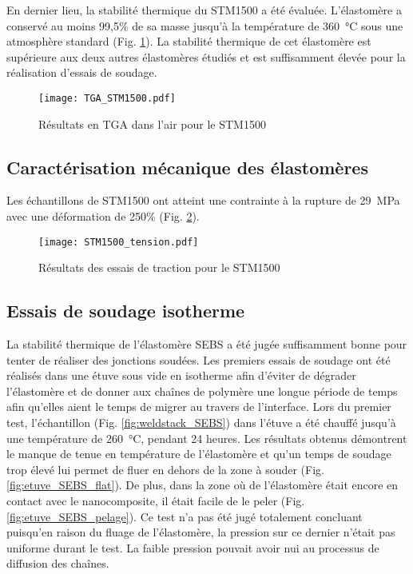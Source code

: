 \FloatBarrier

En dernier lieu, la stabilité thermique du STM1500 a été évaluée. 
L'élastomère a conservé au moins 99,5\% de sa masse jusqu'à la température de \SI{360}{\celsius} sous une atmosphère standard (Fig. \ref{fig:TGA_STM1500}). 
La stabilité thermique de cet élastomère est supérieure aux deux autres élastomères étudiés et est suffisamment élevée pour la réalisation d'essais de soudage. 

\begin{figure}[h]
	\centering
	\texttt{[image: TGA\_STM1500.pdf]}
	\caption{Résultats en TGA dans l'air pour le STM1500}
	\label{fig:TGA_STM1500}
\end{figure}

\FloatBarrier
\subsection{Caractérisation mécanique des élastomères}

Les échantillons de STM1500 ont atteint une contrainte à la rupture de \SI{29}{\mega\pascal} avec une déformation de 250\% (Fig. \ref{fig:STM1500_tension}). 

\begin{figure}[h]
	\centering
	\texttt{[image: STM1500\_tension.pdf]}
	\caption{Résultats des essais de traction pour le STM1500}
	\label{fig:STM1500_tension}
\end{figure}

\FloatBarrier
\subsection{Essais de soudage isotherme}

La stabilité thermique de l'élastomère SEBS a été jugée suffisamment bonne pour tenter de réaliser des jonctions soudées. 
Les premiers essais de soudage ont été réalisés dans une étuve sous vide en isotherme afin d'éviter de dégrader l'élastomère et de donner aux chaînes de polymère une longue période de temps afin qu'elles aient le temps de migrer au travers de l'interface. 
Lors du premier test, l'échantillon (Fig. \ref{fig:weldstack_SEBS}) dans l'étuve a été chauffé jusqu'à une température de \SI{260}{\celsius}, pendant 24 heures. 
Les résultats obtenus démontrent le manque de tenue en température de l'élastomère et qu'un temps de soudage trop élevé lui permet de fluer en dehors de la zone à souder (Fig. \ref{fig:etuve_SEBS_flat}). 
De plus, dans la zone où de l'élastomère était encore en contact avec le nanocomposite, il était facile de le peler (Fig. \ref{fig:etuve_SEBS_pelage}). 
Ce test n'a pas été jugé totalement concluant puisqu'en raison du fluage de l'élastomère, la pression sur ce dernier n'était pas uniforme durant le test. 
La faible pression pouvait avoir nui au processus de diffusion des chaînes. 

